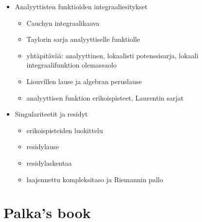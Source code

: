 \begin{itemize}
  \item Analyyttisten funktioiden integraaliesitykset
  \begin{itemize}
    \item Cauchyn integraalikaava
    \item Taylorin sarja analyyttiselle funktiolle
    \item yhtäpitävää:
      analyyttinen, lokaalisti potenssisarja, lokaali integraalifunktion olemassaolo
    \item Liouvillen lause ja algebran peruslause
    \item analyyttisen funktion erikoispisteet, Laurentin sarjat
  \end{itemize}
  \item Singulariteetit ja residyt
  \begin{itemize}
    \item erikoispisteiden luokittelu
    \item residylause
    \item residylaskentaa
    \item laajennettu kompleksitaso ja Riemannin pallo
  \end{itemize}
\end{itemize}


\section{Palka's book}

